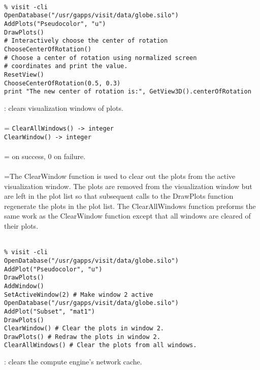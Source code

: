 \documentclass[10pt,a4paper]{report}
\begin{document}
\\[-6mm]
\begin{verbatim}% visit -cli
OpenDatabase("/usr/gapps/visit/data/globe.silo")
AddPlots("Pseudocolor", "u")
DrawPlots()
# Interactively choose the center of rotation
ChooseCenterOfRotation()
# Choose a center of rotation using normalized screen 
# coordinates and print the value.
ResetView()
ChooseCenterOfRotation(0.5, 0.3)
print "The new center of rotation is:", GetView3D().centerOfRotation
\end{verbatim}
\newpage


{}
: clears visualization windows of plots.\\[-3mm]

 \\ 
\hangindent=\parindent 
\verb!ClearAllWindows() -> integer!\\ 
\verb!ClearWindow() -> integer!\\ [-3mm]

 \\ 
\hangindent= on success, 0 on failure. \\[-3mm] 

 \\ 
\hangindent=\parindent The ClearWindow function is used to clear out the plots from the active visualization window. The plots are removed from the visualization window but are left in the plot list so that subsequent calls to the DrawPlots function regenerate the plots in the plot list. The ClearAllWindows function preforms the same work as the ClearWindow function except that all windows are cleared of their plots. \\[-3mm] 

\\[-6mm]
\begin{verbatim}% visit -cli
OpenDatabase("/usr/gapps/visit/data/globe.silo")
AddPlot("Pseudocolor", "u")
DrawPlots()
AddWindow()
SetActiveWindow(2) # Make window 2 active
OpenDatabase("/usr/gapps/visit/data/globe.silo")
AddPlot("Subset", "mat1")
DrawPlots()
ClearWindow() # Clear the plots in window 2.
DrawPlots() # Redraw the plots in window 2.
ClearAllWindows() # Clear the plots from all windows.
\end{verbatim}
\newpage


{}
: clears the compute engine's network cache.\\[-3mm]
\end{document}
